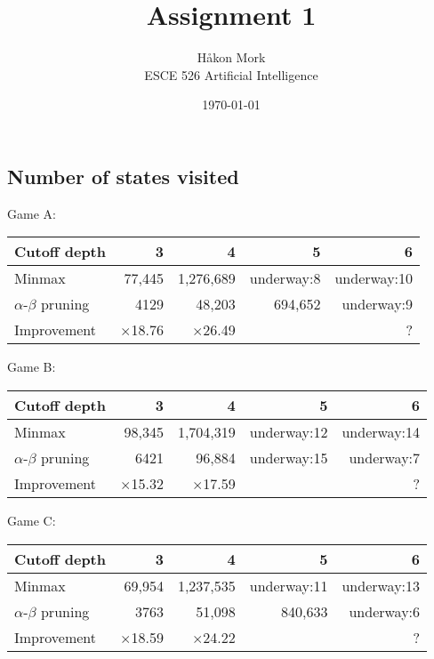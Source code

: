 \documentclass[letterpaper, 12pt]{article}
\title{\textbf{Assignment 1}}
\author{Håkon Mork \\ ESCE 526 Artificial Intelligence}
\date{\today}
\numberwithin{theorem}{section}
\begin{document}
\maketitle
\noindent

\section{}
\subsection{Number of states visited}
Game A:
\begin{table}[h]
	\centering
	\small
	\begin{tabular}{lrrrr}
		Cutoff depth & 3 & 4 & 5 & 6 \\
		\midrule
		Minmax & 77,445 & 1,276,689 & underway:8 & underway:10 \\
		$\alpha$-$\beta$ pruning & 4129 & 48,203 & 694,652 & underway:9 \\
		\midrule
		Improvement & $\times$18.76 & $\times$26.49 & & ?
	\end{tabular}
\end{table}

\noindent Game B:
\begin{table}[h]
	\centering
	\small
	\begin{tabular}{lrrrr}
		Cutoff depth & 3 & 4 & 5 & 6 \\
		\midrule
		Minmax & 98,345 & 1,704,319 & underway:12 & underway:14 \\
		$\alpha$-$\beta$ pruning & 6421 & 96,884 & underway:15 & underway:7 \\
		\midrule
		Improvement & $\times$15.32 & $\times$17.59 & & ?
	\end{tabular}
\end{table}

\noindent Game C:
\begin{table}[h]
	\centering
	\small
	\begin{tabular}{lrrrr}
		Cutoff depth & 3 & 4 & 5 & 6 \\
		\midrule
		Minmax & 69,954 & 1,237,535 & underway:11 & underway:13 \\
		$\alpha$-$\beta$ pruning & 3763 & 51,098 & 840,633 & underway:6 \\
		\midrule
		Improvement & $\times$18.59 & $\times$24.22 & & ?
	\end{tabular}
\end{table}
\end{document}
